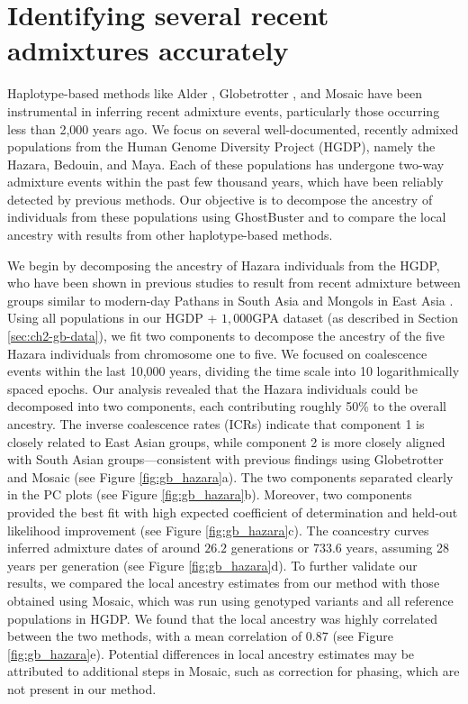 \clearpage

\section{Identifying several recent admixtures accurately}
\label{sec:ch2-gb-real}

Haplotype-based methods like Alder \cite{loh2013inferring}, Globetrotter \cite{hellenthal2014genetic}, and Mosaic \cite{salter2019fine} have been instrumental in inferring recent admixture events, particularly those occurring less than 2,000 years ago. We focus on several well-documented, recently admixed populations from the Human Genome Diversity Project (HGDP), namely the Hazara, Bedouin, and Maya. Each of these populations has undergone two-way admixture events within the past few thousand years, which have been reliably detected by previous methods. Our objective is to decompose the ancestry of individuals from these populations using GhostBuster and to compare the local ancestry with results from other haplotype-based methods.

We begin by decomposing the ancestry of Hazara individuals from the HGDP, who have been shown in previous studies to result from recent admixture between groups similar to modern-day Pathans in South Asia and Mongols in East Asia \cite{hellenthal2014genetic,salter2019fine}. Using all populations in our HGDP + $1{,}000$GPA dataset (as described in Section \ref{sec:ch2-gb-data}), we fit two components to decompose the ancestry of the five Hazara individuals from chromosome one to five. We focused on coalescence events within the last 10,000 years, dividing the time scale into 10 logarithmically spaced epochs. Our analysis revealed that the Hazara individuals could be decomposed into two components, each contributing roughly 50\% to the overall ancestry. The inverse coalescence rates (ICRs) indicate that component 1 is closely related to East Asian groups, while component 2 is more closely aligned with South Asian groups—consistent with previous findings using Globetrotter and Mosaic (see Figure \ref{fig:gb_hazara}a). The two components separated clearly in the PC plots (see Figure \ref{fig:gb_hazara}b). Moreover, two components provided the best fit with high expected coefficient of determination and held-out likelihood improvement (see Figure \ref{fig:gb_hazara}c). The coancestry curves inferred admixture dates of around $26.2$ generations or $733.6$ years, assuming 28 years per generation (see Figure \ref{fig:gb_hazara}d). To further validate our results, we compared the local ancestry estimates from our method with those obtained using Mosaic, which was run using genotyped variants and all reference populations in HGDP. We found that the local ancestry was highly correlated between the two methods, with a mean correlation of $0.87$ (see Figure \ref{fig:gb_hazara}e). Potential differences in local ancestry estimates may be attributed to additional steps in Mosaic, such as correction for phasing, which are not present in our method.

